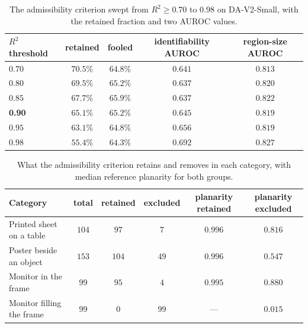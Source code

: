 \documentclass{article} %
\theoremstyle{defstyle}
\theoremstyle{plain}
\begin{document}
\begin{table}[htb]
\caption{The admissibility criterion swept from $R^2 \geq 0.70$ to $0.98$ on DA-V2-Small, with the retained fraction and two AUROC values.}
\label{tab:supp-admissibility}
\begin{center}
\footnotesize
\begin{tabular}{lcccc}
\toprule
$R^2$ threshold & \textbf{retained} & \textbf{fooled} & \textbf{identifiability AUROC} & \textbf{region-size AUROC} \\
\midrule
$0.70$ & $70.5\%$ & $64.8\%$ & $0.641$ & $0.813$ \\
$0.80$ & $69.5\%$ & $65.2\%$ & $0.637$ & $0.820$ \\
$0.85$ & $67.7\%$ & $65.9\%$ & $0.637$ & $0.822$ \\
\textbf{0.90} & $\mathbf{65.1\%}$ & $\mathbf{65.2\%}$ & $\mathbf{0.645}$ & $0.819$ \\
$0.95$ & $63.1\%$ & $64.8\%$ & $0.656$ & $0.819$ \\
$0.98$ & $55.4\%$ & $64.3\%$ & $0.692$ & $0.827$ \\
\bottomrule
\end{tabular}
\end{center}
\end{table}

\begin{table}[htb]
\caption{What the admissibility criterion retains and removes in each category, with median reference planarity for both groups.}
\label{tab:supp-category-exclusion}
\begin{center}
\footnotesize \setlength{\tabcolsep}{3.5pt}
\begin{tabular}{lccccc}
\toprule
\textbf{Category} & \textbf{total} & \textbf{retained} & \textbf{excluded} &
\textbf{planarity retained} & \textbf{planarity excluded} \\
\midrule
Printed sheet on a table  & $104$ & $97$  & $7$   & $0.996$ & $0.816$ \\
Poster beside an object   & $153$ & $104$ & $49$  & $0.996$ & $0.547$ \\
Monitor in the frame      & $99$  & $95$  & $4$   & $0.995$ & $0.880$ \\
Monitor filling the frame & $99$  & $0$   & $99$  & --- & $\mathbf{0.015}$ \\
\bottomrule
\end{tabular}
\end{center}
\end{table}
\end{document}

